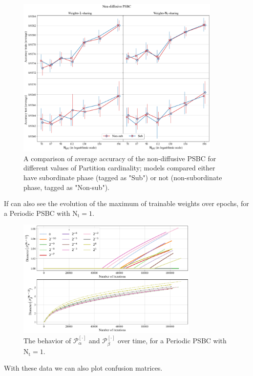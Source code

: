 \documentclass[openany,twoside]{book}
\begin{document}
\begin{figure}[htbp]
\centering
\includegraphics[width=0.9\textwidth,height=\textheight]{figures/output_72_0.png}
\caption{A comparison of average accuracy of the non-diffusive PSBC for different values of Partition cardinality; models compared either have subordinate phase (tagged as "Sub") or not (non-subordinate phase, tagged as "Non-sub").}
\end{figure}
If can also see the evolution of the maximum of trainable weights over epochs, for a Periodic PSBC with \(\mathrm{N_t} =1\).

\begin{figure}[htbp]
\centering
\includegraphics[width=0.8\textwidth,height=\textheight]{figures/output_75_1.png}
\caption{The behavior of $\mathscr{P}_{\alpha}^{[\cdot]}$ and $\mathscr{P}_{\beta}^{[\cdot]}$ over time, for a Periodic PSBC with $\mathrm{N_t} =1$.}
\end{figure}

With these data we can also plot confusion matrices.
\end{document}
